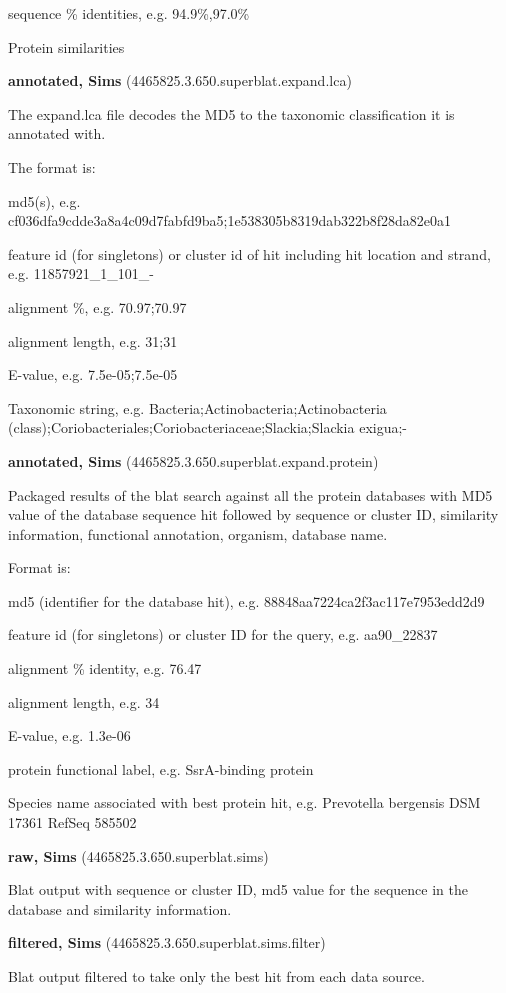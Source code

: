 \documentclass[12pt,fullpage]{report}
\begin{document}
\begin{mdframed}
    sequence \% identities, e.g. 94.9\%,97.0\%

Protein similarities

\textbf{annotated, Sims} (4465825.3.650.superblat.expand.lca)

The expand.lca file decodes the \gls{MD5} to the taxonomic classification it is annotated with.

The format is:

    md5(s), e.g. cf036dfa9cdde3a8a4c09d7fabfd9ba5;1e538305b8319dab322b8f28da82e0a1

    feature id (for singletons) or cluster id of hit including hit location and strand, e.g. 11857921\_1\_101\_-

    alignment \%, e.g. 70.97;70.97

    alignment length, e.g. 31;31

    E-value, e.g. 7.5e-05;7.5e-05

    Taxonomic string, e.g. Bacteria;Actinobacteria;Actinobacteria (class);Coriobacteriales;Coriobacteriaceae;Slackia;Slackia exigua;-


\textbf{annotated, Sims} (4465825.3.650.superblat.expand.protein)

Packaged results of the blat search against all the protein databases with \gls{MD5} value of the database sequence hit followed by sequence or cluster ID, similarity information, functional annotation, organism, database name.

Format is:

    md5 (identifier for the database hit), e.g. 88848aa7224ca2f3ac117e7953edd2d9

    feature id (for singletons) or cluster ID for the query, e.g. aa90\_22837

    alignment \% identity, e.g. 76.47

    alignment length, e.g. 34

    E-value, e.g. 1.3e-06

    protein functional label, e.g. SsrA-binding protein

    Species name associated with best protein hit, e.g. Prevotella bergensis DSM 17361 RefSeq 585502


\textbf{raw, Sims} (4465825.3.650.superblat.sims)

Blat output with sequence or cluster ID, md5 value for the sequence in the database and similarity information.

\textbf{filtered, Sims} (4465825.3.650.superblat.sims.filter)

Blat output filtered to take only the best hit from each data source.
\end{mdframed}
\end{document}

